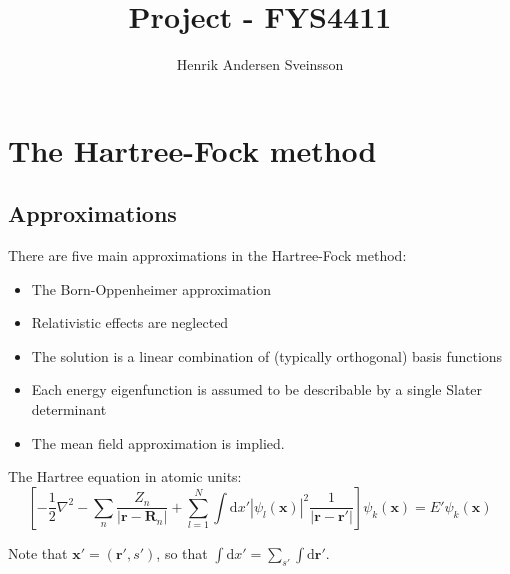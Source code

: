 \documentclass[a4paper,10pt]{article}
\title{Project - FYS4411}
\author{Henrik Andersen Sveinsson}
\newcommand{\rvec}{\mathbf{r}}
\newcommand{\Rvec}{\mathbf{R}}
\newcommand{\xvec}{\mathbf{x}}
\newcommand{\dd}{\mathrm{d}}
\begin{document}
\maketitle

\begin{abstract}

\end{abstract}

\section{The Hartree-Fock method}

\subsection{Approximations}
There are five main approximations in the Hartree-Fock method:
\begin{itemize}
 \item The Born-Oppenheimer approximation
 \item Relativistic effects are neglected
 \item The solution is a linear combination of (typically orthogonal) basis functions
 \item Each energy eigenfunction is assumed to be describable by a single Slater determinant
 \item The mean field approximation is implied. 
\end{itemize}

The Hartree equation in atomic units:
\begin{equation}
 \left[ -\frac{1}{2}\nabla^2 -\sum_n \frac{Z_n}{|\rvec -\Rvec_n|} + 
 \sum_{l=1}^N \int \dd x' |\psi_l(\xvec)|^2 \frac{1}{|\rvec -\rvec'|}\right] \psi_k(\xvec) 
 = E' \psi_k (\xvec)
\end{equation}

Note that $\xvec' = (\rvec', s')$, so that $\int \dd x' = \sum_{s'} \int \dd \rvec'$.
\end{document}
